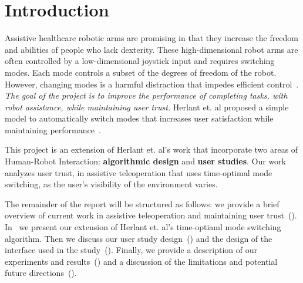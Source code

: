\section{Introduction}
\label{sec:intro}

Assistive healthcare robotic arms are promising in that they increase the freedom and abilities of people who lack dexterity. These high-dimensional robot arms are often controlled by a low-dimensional joystick input and requires switching modes. Each mode controls a subset of the degrees of freedom of the robot. However, changing modes is a harmful distraction that impedes efficient control~\cite{herlant2016assistive}. \textit{The goal of the project is to improve the performance of completing tasks, with robot assistance, while maintaining user trust.} Herlant et. al proposed a simple model to automatically switch modes that increases user satisfaction while maintaining performance~\cite{herlant2016assistive}. 

This project is an extension of Herlant et. al's work that incorporate two areas of Human-Robot Interaction: \textbf{algorithmic design} and \textbf{user studies}. Our work analyzes user trust, in assistive teleoperation that uses time-optimal mode switching, as the user's visibility of the environment varies. 


The remainder of the report will be structured as follows: we provide a brief overview of current work in assistive teleoperation and maintaining user trust~(). In~ we present our extension of Herlant et. al's time-optiaml mode switching algorithm. Then we discuss our user study design~() and the design of the interface used in the study~(). Finally, we provide a description of our experiments and results~() and a discussion of the limitations and potential future directions~().

    
